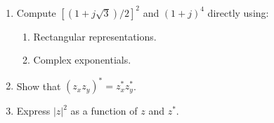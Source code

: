 \begin{enumerate}
  
\item Compute $[(1+j\sqrt{3})/2]^2$ and $(1+j)^4$ directly using: 
  \begin{enumerate}
  \item Rectangular representations.
  \item Complex exponentials.
  \end{enumerate}
%  
\item Show that $(z_xz_y)^* = z_x^* z_y^*$.


\item Express $|z|^2$ as a function of $z$ and $z^*$.
%


\end{enumerate}
